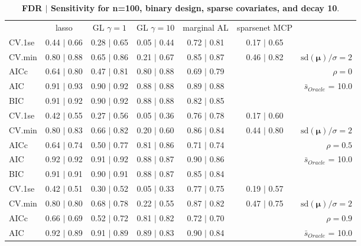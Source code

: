 \begin{table}\vspace{-.5cm}
\caption[l]{ {\it }
{ \bf FDR $\boldsymbol{\mid}$ Sensitivity for n=100, binary design, sparse covariates, and  decay  10}.}
\vspace{-.5cm}
\footnotesize{}
\begin{center}
\begin{tabular}{l*{5}{c}|r}
 & lasso & GL $\gamma=1$ & GL $\gamma=10$ & marginal AL & sparsenet MCP  & \\
 \cline{1-7}
CV.1se & 0.44 $\mid$ 0.66 & 0.28 $\mid$ 0.65 & 0.05 $\mid$ 0.44 & 0.72 $\mid$ 0.81 & 0.17 $\mid$ 0.65 & \\
CV.min & 0.80 $\mid$ 0.88 & 0.65 $\mid$ 0.86 & 0.21 $\mid$ 0.67 & 0.85 $\mid$ 0.87 & 0.46 $\mid$ 0.82 &  $\mathrm{sd}(\mathbf{\mu})/\sigma=2$ \\
AICc & 0.64 $\mid$ 0.80 & 0.47 $\mid$ 0.81 & 0.80 $\mid$ 0.88 & 0.69 $\mid$ 0.79 & & $\rho=0$ \\
AIC & 0.91 $\mid$ 0.93 & 0.90 $\mid$ 0.92 & 0.88 $\mid$ 0.88 & 0.89 $\mid$ 0.88 & &  \multirow{2}{*}{$\bar{s}_{Oracle}$ = 10.0} \\
BIC & 0.91 $\mid$ 0.92 & 0.90 $\mid$ 0.92 & 0.88 $\mid$ 0.88 & 0.82 $\mid$ 0.85 & &  \\
 \hline 
CV.1se & 0.42 $\mid$ 0.55 & 0.27 $\mid$ 0.56 & 0.05 $\mid$ 0.36 & 0.76 $\mid$ 0.78 & 0.17 $\mid$ 0.60 & \\
CV.min & 0.80 $\mid$ 0.83 & 0.66 $\mid$ 0.82 & 0.20 $\mid$ 0.60 & 0.86 $\mid$ 0.84 & 0.44 $\mid$ 0.80 &  $\mathrm{sd}(\mathbf{\mu})/\sigma=2$ \\
AICc & 0.64 $\mid$ 0.74 & 0.50 $\mid$ 0.77 & 0.81 $\mid$ 0.86 & 0.71 $\mid$ 0.74 & & $\rho=0.5$ \\
AIC & 0.92 $\mid$ 0.92 & 0.91 $\mid$ 0.92 & 0.88 $\mid$ 0.87 & 0.90 $\mid$ 0.86 & &  \multirow{2}{*}{$\bar{s}_{Oracle}$ = 10.0} \\
BIC & 0.91 $\mid$ 0.91 & 0.90 $\mid$ 0.91 & 0.88 $\mid$ 0.87 & 0.85 $\mid$ 0.84 & &  \\
 \hline 
CV.1se & 0.42 $\mid$ 0.51 & 0.30 $\mid$ 0.52 & 0.05 $\mid$ 0.33 & 0.77 $\mid$ 0.75 & 0.19 $\mid$ 0.57 & \\
CV.min & 0.80 $\mid$ 0.80 & 0.68 $\mid$ 0.78 & 0.22 $\mid$ 0.55 & 0.87 $\mid$ 0.82 & 0.47 $\mid$ 0.75 &  $\mathrm{sd}(\mathbf{\mu})/\sigma=2$ \\
AICc & 0.66 $\mid$ 0.69 & 0.52 $\mid$ 0.72 & 0.81 $\mid$ 0.82 & 0.72 $\mid$ 0.70 & & $\rho=0.9$ \\
AIC & 0.92 $\mid$ 0.89 & 0.91 $\mid$ 0.89 & 0.89 $\mid$ 0.83 & 0.90 $\mid$ 0.84 & &  \multirow{2}{*}{$\bar{s}_{Oracle}$ = 10.0} \\

\end{tabular}
\end{center}
\end{table}
